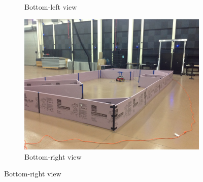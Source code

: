 \documentclass[11pt,professionalfonts,hyperref={pdftex,pdfpagemode=none,pdfstartview=FitH}]{beamer}
\begin{document}
\begin{frame}
\begin{figure}
\begin{subfigure}[b]{0.28\textwidth}
        		\caption*{Bottom-left view}
    	\end{subfigure}
	\hspace*{0.03\textwidth}
	\begin{subfigure}[b]{0.28\textwidth}
        		\includegraphics[width=\textwidth]{test_setup_2.jpg}
        		\caption*{Bottom-right view}
    	\end{subfigure}
\end{figure}

\end{frame}

\end{document}
